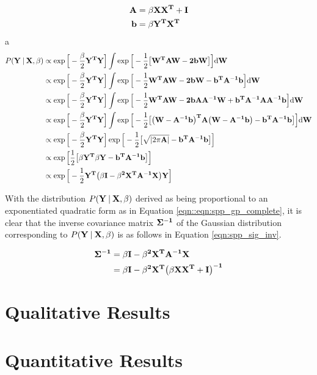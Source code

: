 \begin{align}
  \label{eqn:spp_gp_marginal_change}
  \bf{A} &= \beta \bf{XX}^{T} + \bf{I}\\
  \bf{b} &= \beta \bf{Y}^{T} \bf{X}^{T}
\end{align}
a
\begin{align}
  \label{eqn:spp_gp_complete}
  P(\bf{Y} \:\vert\: \bf{X}, \beta) 
  &\propto \exp{\Big[ -\frac{\beta}{2}\bf{Y}^{T}\bf{Y} \Big]}
  \int \exp{\Big[ -\frac{1}{2} 
  \big[
    \bf{W}^{T}\bf{AW} - 2\bf{bW}  
  \big]
  \Big]} {\mathrm d{\bf{W}}}\\
  &\propto \exp{\Big[ -\frac{\beta}{2}\bf{Y}^{T}\bf{Y} \Big]}
  \int \exp{\Big[ 
    -\frac{1}{2} \bf{W}^{T}\bf{AW} 
    - 2\bf{bW} 
    - \bf{b}^{T}\bf{A}^{-1}\bf{b}  
  \Big]} {\mathrm d{\bf{W}}}\\
  &\propto \exp{\Big[ -\frac{\beta}{2}\bf{Y}^{T}\bf{Y} \Big]}
  \int \exp{\Big[ 
    -\frac{1}{2} \bf{W}^{T}\bf{AW} 
    - 2\bf{bA}\bf{A}^{-1}\bf{W}
    + \bf{b}^{T}\bf{A}^{-1}\bf{AA}^{-1}\bf{b}  
  \Big]} {\mathrm d{\bf{W}}}\\
  &\propto \exp{\Big[ -\frac{\beta}{2}\bf{Y}^{T}\bf{Y} \Big]}
  \int \exp{\Big[ -\frac{1}{2} \big[ 
      \big( \bf{W} - \bf{A}^{-1}\bf{b} \big)^{T}
      \bf{A}
      \big( \bf{W} - \bf{A}^{-1}\bf{b} \big)
      - \bf{b}^{T}\bf{A}^{-1}\bf{b}
    \big]
  \Big]} {\mathrm d{\bf{W}}}\\
  &\propto \exp{\Big[ -\frac{\beta}{2}\bf{Y}^{T}\bf{Y} \Big]}
  \exp{\Big[ -\frac{1}{2} \big[
      \sqrt{\left| 2 \pi \bf{A} \right|}
      - \bf{b}^{T}\bf{A}^{-1}\bf{b}
    \big]
  \Big]}\\
  &\propto \exp{\Big[ \frac{1}{2} \big[
    \beta \bf{Y}^{T} \beta \bf{Y}
    - \bf{b}^{T}\bf{A}^{-1}\bf{b}
    \big]
  \Big]}\\
  &\propto \exp{\Big[ -\frac{1}{2}
  \bf{Y}^{T} \big(
    \beta \bf{I} - \beta^{2}\bf{X}^{T}\bf{A}^{-1}\bf{X}
    \big)\bf{Y}
  \Big]}
\end{align}

With the distribution $P(\bf{Y} \:\vert\: \bf{X}, \beta)$ derived as being proportional to  
an exponentiated quadratic form as in Equation \ref{eqn::eqn:spp_gp_complete}, it is 
clear that the inverse covariance matrix $\bf{\Sigma}^{-1}$ of the Gaussian distribution 
corresponding to $P(\bf{Y} \:\vert\: \bf{X}, \beta)$ is as follows in Equation 
\ref{eqn:spp_sig_inv}.

\begin{align}
  \label{eqn:spp_sig_inv}
  \bf{\Sigma}^{-1} &= \beta \bf{I} - \beta^{2} \bf{X}^{T} \bf{A}^{-1} \bf{X}\\
  &= \beta \bf{I} - \beta^{2} \bf{X}^{T} \big(\beta \bf{XX}^{T} + \bf{I} \big)^{-1}
\end{align}

\section{Qualitative Results}
\label{sec:spp_qualitative}

\section{Quantitative Results}
\label{sec:spp_quantitative}